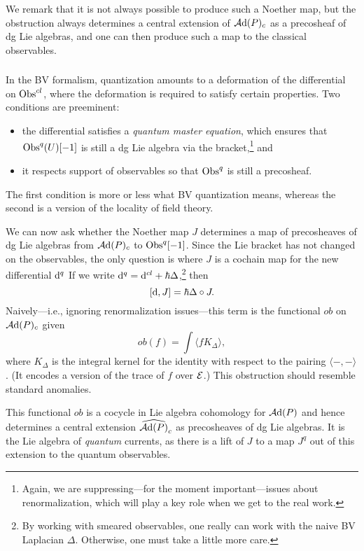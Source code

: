 \begin{rmk}
We remark that it is not always possible to produce such a Noether map,
but the obstruction always determines a central extension of $\mathcal A{\rm d}(P)_c$ as a precosheaf of dg Lie algebras,
and one can then produce such a map to the classical observables.
\end{rmk}

\subsubsection{}

In the BV formalism, quantization amounts to a deformation of the differential on ${\rm Obs}^{cl}$,
where the deformation is required to satisfy certain properties.
Two conditions are preeminent:
\begin{itemize}
\item the differential satisfies a {\em quantum master equation}, which ensures that ${\rm Obs}^q(U)[-1]$ is still a dg Lie algebra via the bracket,\footnote{Again, we are suppressing---for the moment important---issues about renormalization, which will play a key role when we get to the real work.} and
\item it respects support of observables so that ${\rm Obs}^q$ is still a precosheaf.
\end{itemize}
The first condition is more or less what  BV quantization means, 
whereas the second is a version of the locality of field theory.

We can now ask whether the Noether map $J$ determines a map of precosheaves of dg Lie algebras from $\mathcal A{\rm d}(P)_c$ to ${\rm Obs}^q[-1]$.
Since the Lie bracket has not changed on the observables, 
the only question is where $J$ is a cochain map for the new differential ${\rm d}^q$
If we write ${\rm d}^q = {\rm d}^{cl} + \hbar \Delta$,\footnote{By working with smeared observables, one really can work with the naive BV Laplacian $\Delta$. Otherwise, one must take a little more care.} then 
\[
[{\rm d},J] = \hbar \Delta \circ J.
\]
Naively---i.e., ignoring renormalization issues---this term is the functional $ob$ on $\mathcal A{\rm d}(P)_c$ given 
\[
ob(f) = \int \langle f K_\Delta \rangle,
\]
where $K_\Delta$ is the integral kernel for the identity with respect to the pairing $\langle-,-\rangle$.
(It encodes a version of the trace of $f$ over $\mathcal E$.)
This obstruction should resemble standard anomalies.

This functional $ob$ is a cocycle in Lie algebra cohomology for $\mathcal A{\rm d}(P)$ and hence determines a central extension $\widehat{\mathcal A{\rm d}(P)}_c$ as precosheaves of dg Lie algebras.
It is the Lie algebra of {\em quantum} currents, as there is a lift of $J$ to a map $J^q$ out of this extension to the quantum observables.


